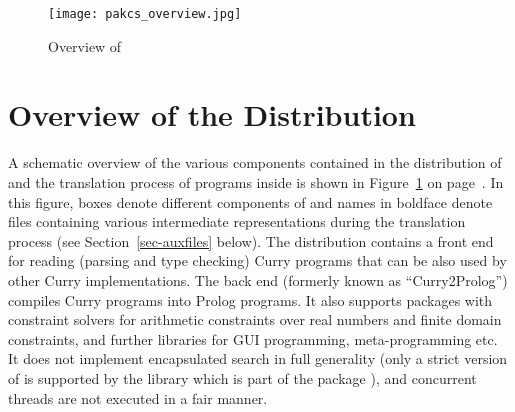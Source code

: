 \begin{figure}%
\begin{center}
 \texttt{[image: pakcs\_overview.jpg]}
\end{center}\vspace{-5ex}
\caption{Overview of \CYS\label{fig-pakcs}}
\end{figure}

\section{Overview of the \CYS Distribution}

A schematic overview of the various components contained in
the distribution of \CYS and the
translation process of programs inside \CYS is shown in
Figure~\ref{fig-pakcs} on page~\pageref{fig-pakcs}.
In this figure, boxes denote different components of \CYS
and names in boldface denote files containing
various intermediate representations during the translation
process (see Section~\ref{sec-auxfiles} below).
The \CYS distribution contains a front end for reading (parsing and
type checking) Curry programs that can be also used by
other Curry implementations.
The back end (formerly known as ``Curry2Prolog'')
compiles Curry programs into Prolog programs.
It also supports packages with constraint solvers for
arithmetic constraints over real numbers and finite domain constraints,
and further libraries for GUI programming, meta-programming etc.
It does not implement encapsulated search in full generality
(only a strict version of  is supported
by the library  which is part of the package
),
and concurrent threads are not executed in a fair manner.



